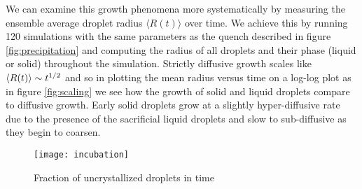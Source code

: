 We can examine this growth phenomena more systematically by measuring the
ensemble average droplet radius $\langle R(t) \rangle$ over time. We achieve
this by running 120 simulations with the same parameters as the quench
described in figure \ref{fig:precipitation} and computing the radius of all
droplets and their phase (liquid or solid) throughout the simulation. Strictly
diffusive growth scales like $\left\langle R(t) \right\rangle \sim t^{1/2}$ and so in plotting the
mean radius versus time on a log-log plot as in figure \ref{fig:scaling} we see
how the growth of solid and liquid droplets compare to diffusive growth. Early
solid droplets grow at a slightly hyper-diffusive rate due to the presence of
the sacrificial liquid droplets and slow to sub-diffusive as they begin to
coarsen.

\begin{figure}
    \centering
    \texttt{[image: incubation]}
    \caption[Fraction of uncrystallized droplets in time]{
        \label{fig:incubation}
        Fraction of uncrystallized droplets in time
    }
\end{figure}
